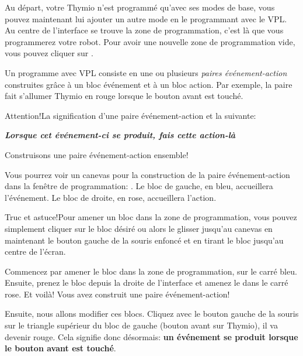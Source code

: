 
Au départ, votre Thymio n'est programmé qu'avec ses modes de base, vous pouvez maintenant lui ajouter un autre mode en le programmant avec le VPL. Au centre de l'interface se trouve la zone de programmation, c'est là que vous programmerez votre robot. Pour avoir une nouvelle zone de programmation vide, vous pouvez cliquer sur  .

Un programme avec VPL consiste en une ou plusieurs \textit{paires événement-action} construites grâce à un bloc événement et à un bloc action. Par exemple, la paire  fait s'allumer Thymio en rouge lorsque le bouton avant est touché.

\begin{bclogo}[couleur = green!30, arrondi = 0.1, logo = \bctakecare, ombre = true]{Attention!}La signification d'une paire événement-action et la suivante:
 
\textbf{\textit{Lorsque cet événement-ci se produit, fais cette action-là}}
\end{bclogo}

Construisons une paire événement-action ensemble! 

Vous pourrez voir un canevas pour la construction de la paire événement-action dans la fenêtre de programmation: . Le bloc de gauche, en bleu, accueillera l'événement. Le bloc de droite, en rose, accueillera l'action.


\begin{bclogo}[couleur = blue!30, arrondi = 0.1, logo = \bcinfo, ombre = true]{Truc et astuce!}Pour amener un bloc dans la zone de programmation, vous pouvez simplement cliquer sur le bloc désiré ou alors le glisser jusqu'au canevas en maintenant le bouton gauche de la souris enfoncé et en tirant le bloc jusqu'au centre de l'écran.
\end{bclogo}

Commencez par amener le bloc  dans la zone de programmation, sur le carré bleu. Ensuite, prenez le bloc  depuis la droite de l'interface et amenez le dans le carré rose. Et voilà! Vous avez construit une paire événement-action!

Ensuite, nous allons modifier ces blocs. Cliquez avec le bouton gauche de la souris sur le triangle supérieur du bloc de gauche (bouton avant sur Thymio), il va devenir rouge.  Cela signifie donc désormais:  \textbf{un événement se produit lorsque le bouton avant est touché}.

